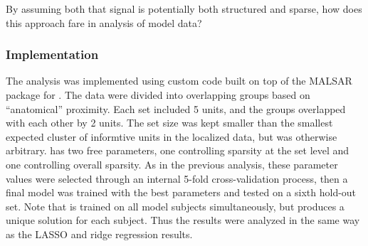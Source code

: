 %
%
%
%
%
%
%

By assuming both that signal is potentially both structured and sparse, how does this approach fare in analysis of model data?

\subsubsection{Implementation} 
The \soslasso analysis was implemented using custom code built on top of the MALSAR package \cite{malsar} for \matlab. The data were divided into overlapping groups based on ``anatomical'' proximity. Each set included 5 units, and the groups overlapped with each other by 2 units. The set size was kept smaller than the smallest expected cluster of informtive units in the localized data, but was otherwise arbitrary. \soslasso has two free parameters, one controlling sparsity at the set level and one controlling overall sparsity. As in the previous analysis, these parameter values  were selected through an internal 5-fold cross-validation process, then a final model was trained with the best parameters and tested on a sixth hold-out set. Note that \soslasso is trained on all model subjects simultaneously, but produces a unique solution for each subject. Thus the results were analyzed in the same way as the LASSO and ridge regression results.

